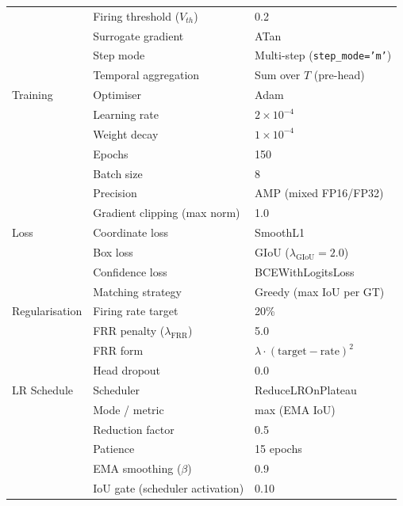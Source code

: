 {\begin{longtable}{|l|l|l|}
                 & Firing threshold ($V_{th}$)          & 0.2 \\
                 & Surrogate gradient                   & ATan \\
                 & Step mode                            & Multi-step (\texttt{step\_mode='m'}) \\
                 & Temporal aggregation                 & Sum over $T$ (pre-head) \\
\hline
Training         & Optimiser                            & Adam \\
                 & Learning rate                        & $2 \times 10^{-4}$ \\
                 & Weight decay                         & $1 \times 10^{-4}$ \\
                 & Epochs                               & 150 \\
                 & Batch size                           & 8 \\
                 & Precision                            & AMP (mixed FP16/FP32) \\
                 & Gradient clipping (max norm)         & 1.0 \\
\hline
Loss             & Coordinate loss                      & SmoothL1 \\
                 & Box loss                             & GIoU ($\lambda_{\text{GIoU}} = 2.0$) \\
                 & Confidence loss                      & BCEWithLogitsLoss \\
                 & Matching strategy                    & Greedy (max IoU per GT) \\
\hline
Regularisation   & Firing rate target                   & 20\% \\
                 & FRR penalty ($\lambda_{\text{FRR}}$) & 5.0 \\
                 & FRR form                             & $\lambda \cdot (\text{target} - \text{rate})^{2}$ \\
                 & Head dropout                         & 0.0 \\
\hline
LR Schedule      & Scheduler                            & ReduceLROnPlateau \\
                 & Mode / metric                        & max (EMA IoU) \\
                 & Reduction factor                     & 0.5 \\
                 & Patience                             & 15 epochs \\
                 & EMA smoothing ($\beta$)              & 0.9 \\
                 & IoU gate (scheduler activation)      & 0.10 \\
\hline
\end{longtable}
}
